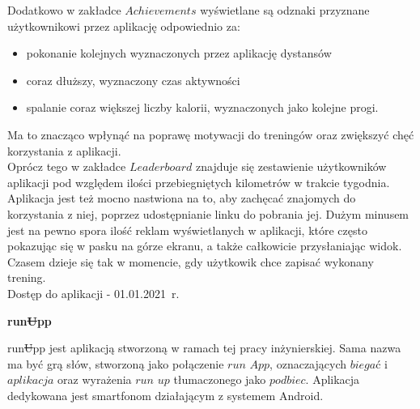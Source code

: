 \documentclass[a4paper,12pt,reqno]{article}
\begin{document}
Dodatkowo w zakładce $Achievements$ wyświetlane są odznaki przyznane użytkownikowi przez aplikację odpowiednio za:
\begin{itemize}
	\item pokonanie kolejnych wyznaczonych przez aplikację dystansów
	\item coraz dłuższy, wyznaczony czas aktywności
	\item spalanie coraz większej liczby kalorii, wyznaczonych jako kolejne progi.
\end{itemize}
Ma to znacząco wpłynąć na poprawę motywacji do treningów oraz zwiększyć chęć korzystania z aplikacji.\\

Oprócz tego w zakładce $Leaderboard$ znajduje się zestawienie użytkowników aplikacji pod względem ilości przebiegniętych kilometrów w trakcie tygodnia.\\

Aplikacja jest też mocno nastwiona na to, aby zachęcać znajomych do korzystania z niej, poprzez udostępnianie linku do pobrania jej. 
Dużym minusem jest na pewno spora ilość reklam wyświetlanych w aplikacji, które często pokazując się w pasku na górze ekranu, a także całkowicie przysłaniając widok. Czasem dzieje się tak w momencie, gdy użytkowik chce zapisać wykonany trening.\\

Dostęp do aplikacji - 01.01.2021~r.

\newpage

\begin{flushleft}
	\Large \textbf{run\sout{U}pp}
\end{flushleft}
\vspace{1cm}

run\sout{U}pp jest aplikacją stworzoną w ramach tej pracy inżynierskiej. Sama nazwa ma być grą słów, stworzoną jako połączenie $run$ $App$, oznaczających $biegać$ i $aplikacja$ oraz wyrażenia $run$ $up$ tłumaczonego jako $podbiec$.
Aplikacja dedykowana jest smartfonom działającym z systemem Android.\\
\end{document}
